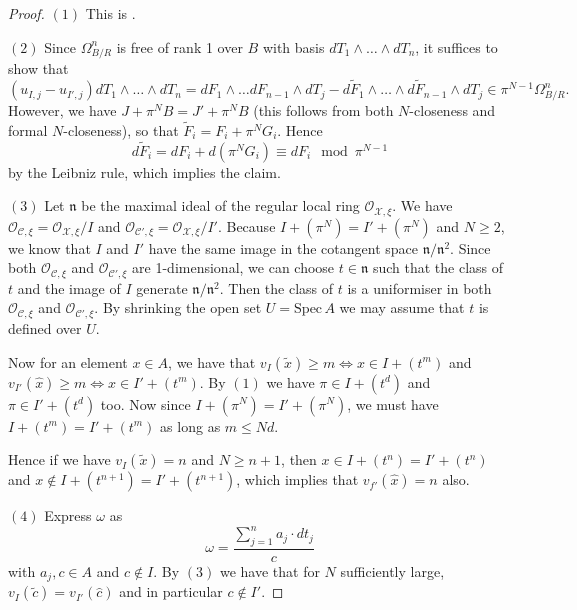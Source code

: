 \documentclass{article}
\theoremstyle{definition}
\theoremstyle{plain}
\theoremstyle{remark}
\newcommand{\spec}{\mathrm{Spec}\,}
\begin{document}
	\begin{proof} 
		$(1)$ This is \cite[Exercise 8.3.3(a)]{liu2002algebraic}.
		
		$(2)$ Since $\Omega^n_{B/R}$ is free of rank 1 over $B$ with basis $dT_1\wedge \ldots \wedge dT_n$, it suffices to show that
		\[(u_{I,j}-u_{I',j})dT_1\wedge \ldots \wedge dT_n = dF_1 \wedge \ldots dF_{n-1}\wedge dT_j - d\widetilde{F}_1\wedge \ldots \wedge d\widetilde{F}_{n-1}\wedge dT_j \in \pi^{N-1}\Omega^n_{B/R}.\]
		However, we have $J + \pi^NB = J' + \pi^N B$ (this follows from both $N$-closeness and formal $N$-closeness), so that $\widetilde{F}_i = F_i + \pi^NG_i$. Hence
		\[d\widetilde{F}_i = dF_i + d(\pi^NG_i)\equiv dF_i \mod \pi^{N-1}\]
		by the Leibniz rule, which implies the claim.
		
		$(3)$ Let $\mathfrak{n}$ be the maximal ideal of the regular local ring $\mathcal{O}_{\mathcal{X}, \xi}$. We have $\mathcal{O}_{\mathcal{C}, \xi} = \mathcal{O}_{\mathcal{X}, \xi}/I$ and $\mathcal{O}_{\mathcal{C}', \xi} = \mathcal{O}_{\mathcal{X}, \xi}/I'$. Because $I + (\pi^N) = I' + (\pi^N)$ and $N\ge 2$, we know that $I$ and $I'$ have the same image in the cotangent space $\mathfrak{n}/\mathfrak{n}^2$. Since both $\mathcal{O}_{\mathcal{C}, \xi}$ and $\mathcal{O}_{\mathcal{C}', \xi}$ are 1-dimensional, we can choose $t\in \mathfrak{n}$ such that the class of $t$ and the image of $I$ generate $\mathfrak{n}/\mathfrak{n}^2$. Then the class of $t$ is a uniformiser in both $\mathcal{O}_{\mathcal{C}, \xi}$ and $\mathcal{O}_{\mathcal{C}', \xi}$. By shrinking the open set $U = \spec A$ we may assume that $t$ is defined over $U$.
		
		Now for an element $x\in A$, we have that $v_I(\widetilde{x}) \ge m \iff x \in I + (t^m)$ and $v_{I'}(\widehat{x}) \ge m \iff x \in I' + (t^m)$. By $(1)$ we have $\pi \in I + (t^d)$ and $\pi \in I' + (t^d)$ too. Now since $I + (\pi^N) = I' + (\pi^N)$, we must have $I + (t^m) = I' + (t^m)$ as long as $m\le Nd$.
		
		Hence if we have $v_I(\widetilde{x}) = n$ and $N\ge n+1$, then $x\in I + (t^n) = I' + (t^n)$ and $x \not \in I + (t^{n+1}) = I' + (t^{n+1})$, which implies that $v_{f'}(\widehat{x}) = n$ also.
		
		$(4)$ Express $\omega$ as
		\[\omega = \frac{\sum_{j=1}^n a_j\cdot dt_j}{c}\]
		with $a_j, c\in A$ and $c\not\in I$. By $(3)$ we have that for $N$ sufficiently large, $v_I(\widetilde{c}) = v_{I'}(\widehat{c})$ and in particular $c\not\in I'$.
		

\end{proof}
\end{document}

